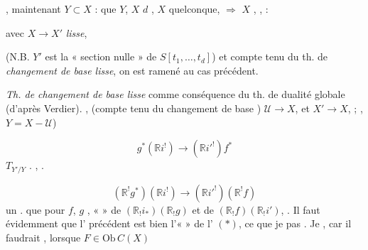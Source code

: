 \documentclass[11pt,a4paper]{article}
\begin{document}
\struck{\ill{} \ill{}}, \struck{\ill{} \ill{}} \ill{} maintenant
$Y \subset X$ \ill{} \ill{} \ill{} : \ill{} \ill{} que $Y$, $X$
\ill{} \ill{} \ill{} \ill{} $d$ \ill{} \ill{} \ill{} \ill{} \ill{}, $X$
quelconque, \ill{} \struck{\ill{}} \ill{} $\Rightarrow$ \ill{}
\ill{} \ill{} \ill{} \ill{} \ill{}  \ill{}
\ill{} \ill{} \ill{} \ill{} \ill{} $X$ \ill{} \ill{} \ill{}
 \ill{}, \ill{} \ill{}, \ill{} \ill{}
 \ill{} \ill{} :


 avec $X \to X'$ \emph{lisse},

(N.B. $Y'$ est la « section nulle » de $S[t_1, \ldots, t_d]$) et compte tenu
du th. de \emph{changement de base lisse}, on est ramené au cas précédent.

\emph{Th. de changement de base lisse} comme conséquence du th. de dualité
globale (d'après Verdier). \ill{} , \ill{}
  (compte tenu du changement de base
) \ill{} \ill{} \ill{}  
$\mathcal{U} \to X$, \ill{} et \ill{} \ill{} \ill{} \ill{} $X' \to X$, \ill{}
\ill{} \ill{} \ill{} ; \ill{} \ill{} \ill{}, \ill{} \ill{}
$Y = X - \mathcal{U}$)


\[
g^*(\mathbb{R} i^!) \longrightarrow (\mathbb{R} i'^!) f^*
\]
$T_{Y'/Y}$ \ill{}. \ill{} \ill{} \ill{} \ill{}, \ill{} \ill{} \ill{} \ill{}.

\ill{} \ill{} \ill{} 
\[
(\mathbb{R}^! g^*)(\mathbb{R} i^!) \longrightarrow (\mathbb{R} i'^!)(\mathbb{R}^! f)
\]
\ill{} \ill{} \ill{} un . \ill{} \ill{} 
\ill{}  que pour $f$, $g$ \ill{}, \ill{} \ill{}
\ill{} \ill{} «  » de
$(\mathbb{R}_! i_*)(\mathbb{R}_! g)$ et de
$(\mathbb{R}_! f)(\mathbb{R}_! i')$, \ill{} 
 . Il faut évidemment
 que l'\struck{\ill{}}  \struck{\ill{}}
précédent est bien l'«  » de l'\ill{} $(*)$, ce que je
 pas . Je \ill{} \ill{} \ill{} \ill{}
 \ill{}, car il faudrait , lorsque \ill{}
\ill{} \ill{}  $F \in \mathrm{Ob}\, C(X)$
\end{document}

